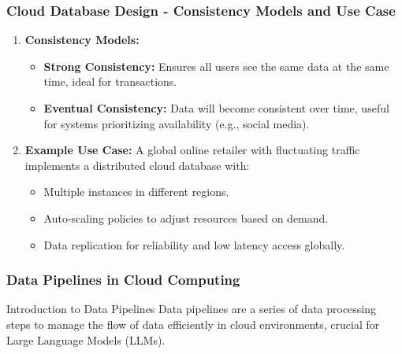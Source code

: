 \documentclass[aspectratio=169]{beamer}
\begin{document}
\begin{frame}[fragile]
    \frametitle{Cloud Database Design - Consistency Models and Use Case}
    \begin{enumerate}[resume]
        \item \textbf{Consistency Models:}
            \begin{itemize}
                \item \textbf{Strong Consistency:} Ensures all users see the same data at the same time, ideal for transactions.
                \item \textbf{Eventual Consistency:} Data will become consistent over time, useful for systems prioritizing availability (e.g., social media).
            \end{itemize}
        
        \item \textbf{Example Use Case:}
            A global online retailer with fluctuating traffic implements a distributed cloud database with:
            \begin{itemize}
                \item Multiple instances in different regions.
                \item Auto-scaling policies to adjust resources based on demand.
                \item Data replication for reliability and low latency access globally.
            \end{itemize}
    \end{enumerate}
\end{frame}

\begin{frame}[fragile]
    \frametitle{Data Pipelines in Cloud Computing}
    \begin{block}{Introduction to Data Pipelines}
        Data pipelines are a series of data processing steps to manage the flow of data efficiently in cloud environments, crucial for Large Language Models (LLMs).
    \end{block}
\end{frame}
\end{document}
